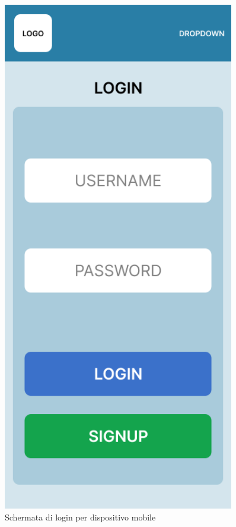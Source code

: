 \begin{figure}[H]
    \centering
    \begin{minipage}{0.45\textwidth}
        \centering
        \includegraphics[width=0.9\textwidth]{img/figma/AndroidLarge-1.png} \caption{Schermata di login per dispositivo mobile}

\end{minipage}
\end{figure}
